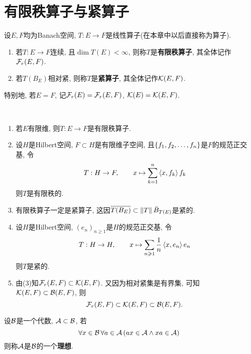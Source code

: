 \section{有限秩算子与紧算子}

\begin{Definition}
	设$ E, F $均为Banach空间, $ T : E\to F $是线性算子(在本章中以后直接称为算子).
	\begin{enumerate}[(1)]
		\item 若$ T : E\to F $连续, 且$ \dim T(E)<\infty $, 则称$ T $是\textbf{有限秩算子}, 其全体记作$ \mathcal{F}_{r}(E,F) $.
		\item 若$ T(B_E) $相对紧, 则称$ T $是\textbf{紧算子}, 其全体记作$ \mathcal{K}(E,F) $.
	\end{enumerate}
	特别地, 若$ E=F $, 记$ \mathcal{F}_{r}(E)=\mathcal{F}_{r}(E,F) $, $ \mathcal{K}(E)=\mathcal{K}(E,F) $.
\end{Definition}

\begin{Example}~
	\begin{enumerate}[(1)]
		\item 若$ E $有限维, 则$ T : E\to F $是有限秩算子.
		\item 设$ H $是Hilbert空间, $ F\subset H $是有限维子空间, 且$ \{ f_{1}, f_{2}, \dots, f_{n} \} $是$ F $的规范正交基, 令
		      \[
			      T : H\to F,\qquad x\mapsto\sum_{k=1}^n\left\langle x,f_k \right\rangle f_k
		      \]
		      则$ T $是有限秩的.
		\item 有限秩算子一定是紧算子, 这因$ \overline{T(B_E)}\subset\left\| T \right\|\bar{B}_{T(E)} $是紧的.
		\item 设$ H $是Hilbert空间, $ (e_n)_{n\geqslant 1} $是$ H $的规范正交基, 令
		      \[
			      T : H\to H,\qquad x\mapsto\sum_{n\geqslant 1}\frac{1}{n}\left\langle x,e_n \right\rangle e_n
		      \]
		      则$ T $是紧的.
		\item 由(3)知$ \mathcal{F}_{r}(E,F)\subset\mathcal{K}(E,F) $. 又因为相对紧集是有界集, 可知$ \mathcal{K}(E,F)\subset\mathcal{B}(E,F) $, 则
		      \[
			      \mathcal{F}_{r}(E,F)\subset\mathcal{K}(E,F)\subset\mathcal{B}(E,F).
		      \]
	\end{enumerate}
\end{Example}

\begin{Definition}[理想]
	设$ \mathcal{B} $是一个代数, $ \mathcal{A}\subset\mathcal{B} $, 若
	\[
		\forall x\in\mathcal{B}\,\forall a\in\mathcal{A}\,(ax\in\mathcal{A}\land xa\in\mathcal{A})
	\]
	则称$ \mathcal{A} $是$ \mathcal{B} $的一个\textbf{理想}.
\end{Definition}

